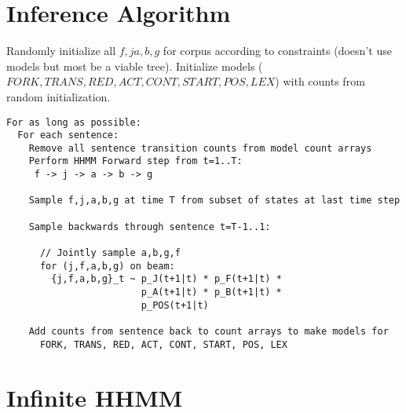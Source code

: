 \documentclass[12pt]{article}
\begin{document}
\section{Inference Algorithm}


Randomly initialize all $f, j a, b, g$ for corpus according to constraints (doesn't use models but most be a viable tree). Initialize models ($FORK, TRANS, RED, ACT, CONT, START, POS, LEX$) with counts from random initialization.

\begin{samepage}
\begin{verbatim}
For as long as possible:
  For each sentence:
    Remove all sentence transition counts from model count arrays
    Perform HHMM Forward step from t=1..T:
     f -> j -> a -> b -> g
  
    Sample f,j,a,b,g at time T from subset of states at last time step
  
    Sample backwards through sentence t=T-1..1:
    
      // Jointly sample a,b,g,f
      for (j,f,a,b,g) on beam:
        {j,f,a,b,g}_t ~ p_J(t+1|t) * p_F(t+1|t) *
        			    p_A(t+1|t) * p_B(t+1|t) *
                        p_POS(t+1|t)
      
    Add counts from sentence back to count arrays to make models for
      FORK, TRANS, RED, ACT, CONT, START, POS, LEX
\end{verbatim}
\end{samepage}

\section{Infinite HHMM}

\begin{figure}[t]

\end{figure}
\end{document}
